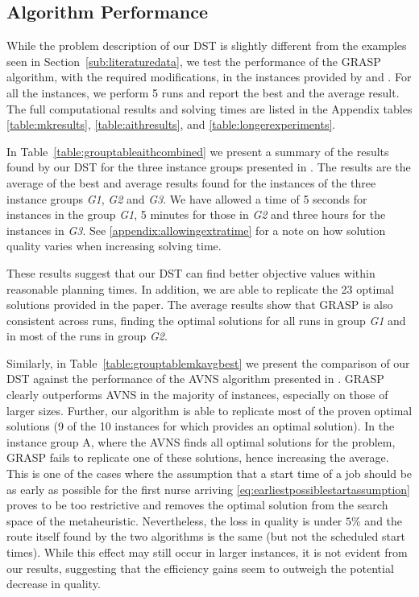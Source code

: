 \documentclass[a4paper,11pt,authoryear]{elsarticle}
\begin{document}
\subsection{Algorithm Performance}
\label{sub:algorithmperformance}
\noindent While the problem description of our DST is slightly different from the examples seen in Section~\ref{sub:literaturedata}, we test the performance of the GRASP algorithm, with the required modifications, in the instances provided by \cite{aithaddadene2016} and \cite{mankowska2014}. For all the instances, we perform 5 runs and report the best and the average result. The full computational results and solving times are listed in the Appendix tables \ref{table:mkresults}, \ref{table:aithresults}, and \ref{table:longerexperiments}. 

In Table~\ref{table:grouptableaithcombined} we present a summary of the results found by our DST for the three instance groups presented in \cite{aithaddadene2016}. The results are the average of the best and average results found for the instances of the three instance groups \emph{G1}, \emph{G2} and \emph{G3}. We have allowed a time of 5 seconds for instances in the group \emph{G1}, 5 minutes for those in \emph{G2} and three hours for the instances in \emph{G3}. See \ref{appendix:allowingextratime} for a note on how solution quality varies when increasing solving time.



\noindent These results suggest that our DST can find better objective values within reasonable planning times. In addition, we are able to replicate the 23 optimal solutions provided in the paper. The average results show that GRASP is also consistent across runs, finding the optimal solutions for all runs in group \emph{G1} and in most of the runs in group \emph{G2}.

Similarly, in Table~\ref{table:grouptablemkavgbest} we present the comparison of our DST against the performance of the AVNS algorithm presented in \citet{mankowska2014}. GRASP clearly outperforms AVNS in the majority of instances, especially on those of larger sizes. Further, our algorithm is able to replicate most of the proven optimal solutions (9 of the 10 instances for which \cite{mankowska2014} provides an optimal solution). In the instance group A, where the AVNS finds all optimal solutions for the problem, GRASP fails to replicate one of these solutions, hence increasing the average. This is one of the cases where the assumption that a start time of a job should be as early as possible for the first nurse arriving \eqref{eq:earliestpossiblestartassumption} proves to be too restrictive and removes the optimal solution from the search space of the metaheuristic. Nevertheless, the loss in quality is under $5\%$ and the route itself found by the two algorithms is the same (but not the scheduled start times). While this effect may still occur in larger instances, it is not evident from our results, suggesting that the efficiency gains seem to outweigh the potential decrease in quality.
\end{document}
